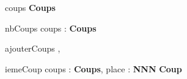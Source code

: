 \begin{algorithme}
	\signaturefonction
	{coups}
	{}
	{\textbf{Coups}}
	
	\vspace*{5mm}
	
	\signaturefonction
	{nbCoups}
	{coups : \textbf{Coups}}
	{\naturel}
	
	\vspace*{5mm}
	
	\signatureprocedure
	{ajouterCoups}
	{,}
	
	\vspace*{5mm}
	
	\signaturefonction
	{iemeCoup}
	{coups : \textbf{Coups}, place : \textbf{NNN}}
	{\textbf{Coup}}
	
	
	
\end{algorithme}
